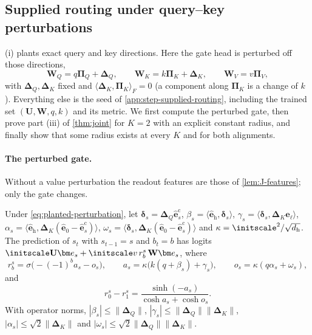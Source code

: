 \subsection{Supplied routing under query--key perturbations}
\label{app:perturbed-routing}

(i) plants exact query and key directions. Here the gate head is perturbed off those directions,
\begin{equation}
 \mathbf W_Q=q\bm\Pi_Q+\bm\Delta_Q,\qquad \mathbf W_K=k\bm\Pi_K+\bm\Delta_K,\qquad \mathbf W_V=v\bm\Pi_V,
 \label{eq:planted-perturbation}
\end{equation}
with $\bm\Delta_Q,\bm\Delta_K$ fixed and $\langle\bm\Delta_K,\bm\Pi_K\rangle_F=0$ (a component along $\bm\Pi_K$ is a change of $k$).
Everything else is the seed of \cref{app:step-supplied-routing}, including the trained set $(\mathbf U,\mathbf W,q,k)$ and its metric.
We first compute the perturbed gate, then prove part (iii) of \cref{thm:joint} for $K=2$ with an explicit constant radius, and finally
show that some radius exists at every $K$ and for both alignments.

\paragraph{The perturbed gate.} Without a value perturbation the readout features are those of \cref{lem:J-features};
only the gate changes.

\begin{lemma}
\label{lem:perturbed-gate}
Under \cref{eq:planted-perturbation}, let $\bm\delta_s=\bm\Delta_Q\hat{\bm e}^{\mathrm c}_s$, $\beta_s=\langle\hat{\bm e}_{\mathrm h},\bm\delta_s\rangle$,
$\gamma_s=\langle\bm\delta_s,\bm\Delta_K\hat{\bm e}_\ell\rangle$, $\alpha_s=\langle\hat{\bm e}_{\mathrm h},\bm\Delta_K(\hat{\bm e}_0-\hat{\bm e}^{\mathrm c}_s)\rangle$,
$\omega_s=\langle\bm\delta_s,\bm\Delta_K(\hat{\bm e}_0-\hat{\bm e}^{\mathrm c}_s)\rangle$ and $\kappa=\initscale^2/\sqrt{d_{\mathrm h}}$. The prediction of $s_t$ with
$s_{t-1}=s$ and $b_t=b$ has logits $\initscale\mathbf U\bm e_s+\initscale v\,r^s_b\,\mathbf W\bm e_s$, where
\begin{equation}
 r^s_b=\sigma\bigl(-(-1)^ba_s-o_s\bigr),\qquad a_s=\kappa\bigl(k(q+\beta_s)+\gamma_s\bigr),\qquad o_s=\kappa(q\alpha_s+\omega_s),
 \label{eq:perturbed-gate}
\end{equation}
and
\begin{equation}
 r^s_0-r^s_1=\frac{\sinh(-a_s)}{\cosh a_s+\cosh o_s}.
 \label{eq:perturbed-contrast}
\end{equation}
With operator norms, $|\beta_s|\le\|\bm\Delta_Q\|$, $|\gamma_s|\le\|\bm\Delta_Q\|\|\bm\Delta_K\|$, $|\alpha_s|\le\sqrt2\|\bm\Delta_K\|$ and
$|\omega_s|\le\sqrt2\|\bm\Delta_Q\|\|\bm\Delta_K\|$.
\end{lemma}


